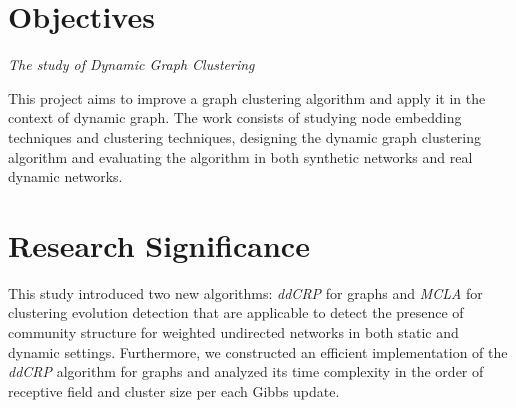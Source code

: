 \section{Objectives}
\begin{center}
\emph{The study of Dynamic Graph Clustering}
\end{center}

This project aims to improve a graph clustering algorithm and apply it in the context of dynamic graph. The work consists of studying node embedding techniques and clustering techniques, designing the dynamic graph clustering algorithm and evaluating the algorithm in both synthetic networks and real dynamic networks.


\section{Research Significance}

This study introduced two new algorithms: \emph{ddCRP} for graphs and \emph{MCLA} for clustering evolution detection that are applicable to detect the presence of community structure for weighted undirected networks in both static and dynamic settings. Furthermore, we constructed an efficient implementation of the \emph{ddCRP} algorithm for graphs and analyzed its time complexity in the order of receptive field and cluster size per each Gibbs update.
